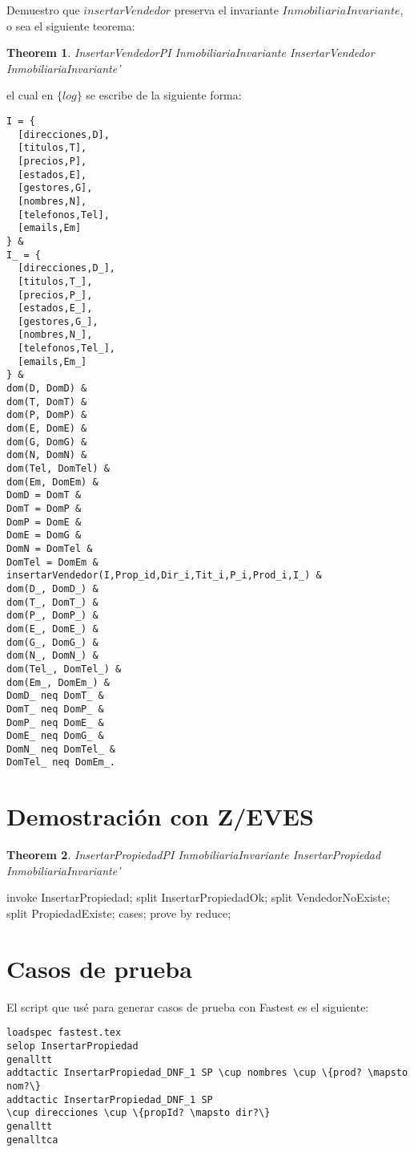 \documentclass[12pt]{article}
\newtheorem{theorem}{Theorem}
\newcommand{\setlog}{$\{log\}$\xspace}
\begin{document}
Demuestro que $insertarVendedor$ preserva el invariante $InmobiliariaInvariante$, o sea el siguiente teorema:
\begin{theorem}{InsertarVendedorPI}
InmobiliariaInvariante \land InsertarVendedor \implies InmobiliariaInvariante'
\end{theorem}
el cual en \setlog se escribe de la siguiente forma:
\begin{verbatim}
I = {
  [direcciones,D],
  [titulos,T],
  [precios,P],
  [estados,E],
  [gestores,G],
  [nombres,N],
  [telefonos,Tel],
  [emails,Em]
} &
I_ = {
  [direcciones,D_],
  [titulos,T_],
  [precios,P_],
  [estados,E_],
  [gestores,G_],
  [nombres,N_],
  [telefonos,Tel_],
  [emails,Em_]
} &
dom(D, DomD) &  
dom(T, DomT) &  
dom(P, DomP) &  
dom(E, DomE) &  
dom(G, DomG) &  
dom(N, DomN) &  
dom(Tel, DomTel) &  
dom(Em, DomEm) &
DomD = DomT &
DomT = DomP &
DomP = DomE &
DomE = DomG &
DomN = DomTel &
DomTel = DomEm &
insertarVendedor(I,Prop_id,Dir_i,Tit_i,P_i,Prod_i,I_) &
dom(D_, DomD_) &  
dom(T_, DomT_) &  
dom(P_, DomP_) &  
dom(E_, DomE_) &  
dom(G_, DomG_) &  
dom(N_, DomN_) &  
dom(Tel_, DomTel_) &  
dom(Em_, DomEm_) &
DomD_ neq DomT_ &
DomT_ neq DomP_ &
DomP_ neq DomE_ &
DomE_ neq DomG_ &
DomN_ neq DomTel_ &
DomTel_ neq DomEm_.
\end{verbatim}


\section{Demostración con Z/EVES}

\begin{theorem}{InsertarPropiedadPI}
InmobiliariaInvariante \land InsertarPropiedad \implies InmobiliariaInvariante'
\end{theorem}

\begin{zproof}[InsertarPropiedadPI]
invoke InsertarPropiedad;
split InsertarPropiedadOk;
split VendedorNoExiste;
split PropiedadExiste;
cases;
prove by reduce;
\end{zproof}

\pagebreak

\section{Casos de prueba}

El script que usé para generar casos de prueba con Fastest es el siguiente:

\begin{verbatim}
loadspec fastest.tex
selop InsertarPropiedad
genalltt
addtactic InsertarPropiedad_DNF_1 SP \cup nombres \cup \{prod? \mapsto nom?\}
addtactic InsertarPropiedad_DNF_1 SP 
\cup direcciones \cup \{propId? \mapsto dir?\}
genalltt
genalltca
\end{verbatim}
\end{document}
